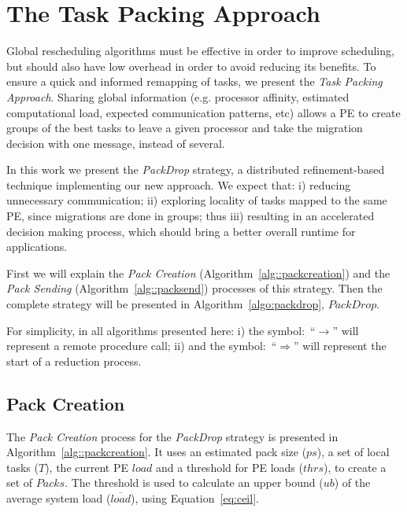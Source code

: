 \section{The Task Packing Approach}

Global rescheduling algorithms must be effective in order to improve scheduling, but should also have low overhead in order to avoid reducing its benefits.
To ensure a quick and informed remapping of tasks, we present the \textit{Task Packing Approach}.
Sharing global information (e.g. processor affinity, estimated computational load, expected communication patterns, etc) allows a PE to create groups of the best tasks to leave a given processor and take the migration decision with one message, instead of several.

In this work we present the \textit{PackDrop} strategy, a distributed refinement-based technique implementing our new approach. %
We expect that: i) reducing unnecessary communication; ii) exploring locality of tasks mapped to the same PE, since migrations are done in groups; thus iii) resulting in an accelerated decision making process, which should bring a better overall runtime for applications. %

First we will explain the \textit{Pack Creation} (Algorithm~\ref{alg::packcreation}) and the \textit{Pack Sending} (Algorithm~\ref{alg::packsend}) processes of this strategy.
Then the complete strategy will be presented in Algorithm~\ref{algo:packdrop}, $PackDrop$.

For simplicity, in all algorithms presented here: i) the symbol:~``$\rightarrow$'' will represent a remote procedure call; ii) and the symbol:~``$\Rightarrow$'' will  represent the start of a reduction process.

\subsection{Pack Creation}

The \textit{Pack Creation} process for the \textit{PackDrop} strategy is presented in Algorithm~\ref{alg::packcreation}.
It uses an estimated pack size ($ps$), a set of local tasks ($T$), the current PE $load$ and a threshold for PE loads ($thrs$), to create a set of $Packs$.
The threshold is used to calculate an upper bound ($ub$) of the average system load ($\overline{load}$), using Equation~\ref{eq:ceil}. 

